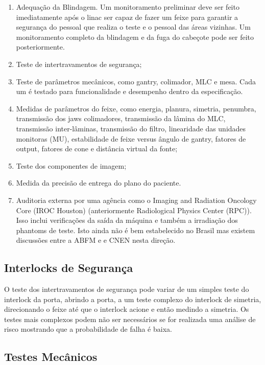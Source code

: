 \documentclass[11pt,a4paper]{article}
\begin{document}
	\begin{enumerate}
		\item Adequação da Blindagem. Um monitoramento preliminar deve ser feito imediatamente após o linac ser capaz de fazer um feixe para garantir a segurança do pessoal que realiza o teste e o pessoal das áreas vizinhas. Um monitoramento completo da blindagem e da fuga do cabeçote pode ser feito posteriormente.
		\item Teste de intertravamentos de segurança;
		\item Teste de parâmetros mecânicos, como gantry, colimador, MLC e mesa. Cada um é testado para funcionalidade e desempenho dentro da especificação.
		\item Medidas de parâmetros do feixe, como energia, planura, simetria, penumbra, transmissão dos jaws colimadores, transmissão da lâmina do MLC, transmissão inter-lâminas, transmissão do filtro, linearidade das unidades monitoras (MU), estabilidade de feixe versus ângulo de gantry, fatores de output, fatores de cone e  distância virtual da fonte;
		\item Teste dos componentes de imagem;
		\item Medida da precisão de entrega do plano do paciente.
		\item Auditoria externa por uma agência como o Imaging and Radiation Oncology Core (IROC Houston) (anteriormente Radiological Physics Center (RPC)). Isso inclui verificações da saída da máquina e também a irradiação dos phantoms de teste. Isto ainda não é bem estabelecido no Brasil mas existem discussões entre a ABFM e e CNEN nesta direção.
	\end{enumerate}

\subsection{Interlocks de Segurança}

	O teste dos intertravamentos de segurança pode variar de um simples teste do interlock da porta, abrindo a porta, a um teste complexo do interlock de simetria, direcionando o feixe até que o interlock acione e então medindo a simetria. Os testes mais complexos podem não ser necessários se for realizada uma análise de risco mostrando que a probabilidade de falha é baixa.

\subsection*{Testes Mecânicos}
\end{document}
